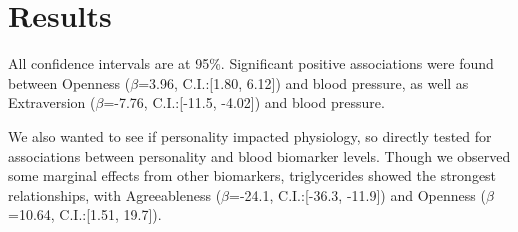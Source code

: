 \documentclass[a0,landscape]{a0poster}
\begin{document}

\color{Black}
\section*{Results}

All confidence intervals are at 95\%. Significant positive associations were found between Openness ($\beta$=3.96, C.I.:[1.80, 6.12]) and blood pressure, as well as Extraversion ($\beta$=-7.76, C.I.:[-11.5, -4.02]) and blood pressure.

We also wanted to see if personality impacted physiology, so directly tested for associations between personality and blood biomarker levels. Though we observed some marginal effects from other biomarkers, triglycerides showed the strongest relationships, with Agreeableness ($\beta$=-24.1, C.I.:[-36.3, -11.9]) and Openness ($\beta$=10.64, C.I.:[1.51, 19.7]).



%
%
\end{document}
